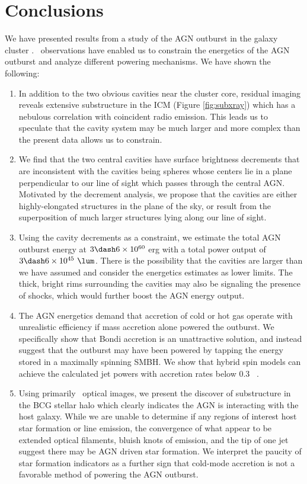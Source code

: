 \documentclass[11pt, preprint]{aastex}
\begin{document}
\section{Conclusions}
\label{sec:con}

We have presented results from a study of the AGN outburst in the
galaxy cluster \rbs. \cxo\ observations have enabled us to constrain
the energetics of the AGN outburst and analyze different powering
mechanisms. We have shown the following:
\begin{enumerate}
\item In addition to the two obvious cavities near the cluster core,
  residual imaging reveals extensive substructure in the ICM (Figure
  \ref{fig:subxray}) which has a nebulous correlation with coincident
  radio emission. This leads us to speculate that the cavity system
  may be much larger and more complex than the present data allows us
  to constrain.
\item We find that the two central cavities have surface brightness
  decrements that are inconsistent with the cavities being spheres
  whose centers lie in a plane perpendicular to our line of sight which
  passes through the central AGN. Motivated by the decrement analysis,
  we propose that the cavities are either highly-elongated structures
  in the plane of the sky, or result from the superposition of much
  larger structures lying along our line of sight.
\item Using the cavity decrements as a constraint, we estimate the
  total AGN outburst energy at $3 \dash 6 \times 10^{60}$ erg with a
  total power output of $3 \dash 6 \times 10^{45} ~\lum$. There is the
  possibility that the cavities are larger than we have assumed and
  consider the energetics estimates as lower limits. The thick, bright
  rims surrounding the cavities may also be signaling the presence of
  shocks, which would further boost the AGN energy output.
\item The AGN energetics demand that accretion of cold or hot gas
  operate with unrealistic efficiency if mass accretion alone powered
  the outburst. We specifically show that Bondi accretion is an
  unattractive solution, and instead suggest that the outburst may
  have been powered by tapping the energy stored in a maximally
  spinning SMBH. We show that hybrid spin models can achieve the
  calculated jet powers with accretion rates below 0.3 ~\msolpy.
\item Using primarily \hst\ optical images, we present the discover of
  substructure in the BCG stellar halo which clearly indicates the AGN
  is interacting with the host galaxy. While we are unable to
  determine if any regions of interest host star formation or line
  emission, the convergence of what appear to be extended optical
  filaments, bluish knots of emission, and the tip of one jet suggest
  there may be AGN driven star formation. We interpret the paucity of
  star formation indicators as a further sign that cold-mode accretion
  is not a favorable method of powering the AGN outburst.
\end{enumerate}
\end{document}
